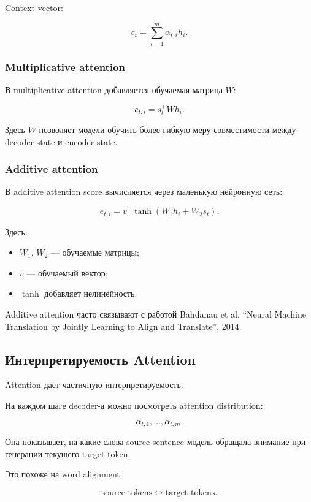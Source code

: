 \documentclass[a4paper,12pt]{article}
\begin{document}
Context vector:

\[
c_t
=
\sum_{i=1}^{m}
\alpha_{t,i}h_i.
\]

\subsubsection{Multiplicative attention}

В multiplicative attention добавляется обучаемая матрица \(W\):

\[
e_{t,i}
=
s_t^\top W h_i.
\]

Здесь \(W\) позволяет модели обучить более гибкую меру совместимости между decoder state и encoder state.

\subsubsection{Additive attention}

В additive attention score вычисляется через маленькую нейронную сеть:

\[
e_{t,i}
=
v^\top
\tanh(W_1 h_i + W_2 s_t).
\]

Здесь:

\begin{itemize}
    \item \(W_1\), \(W_2\) --- обучаемые матрицы;
    \item \(v\) --- обучаемый вектор;
    \item \(\tanh\) добавляет нелинейность.
\end{itemize}

Additive attention часто связывают с работой Bahdanau et al. ``Neural Machine Translation by Jointly Learning to Align and Translate'', 2014.

\subsection{Интерпретируемость Attention}

Attention даёт частичную интерпретируемость.

На каждом шаге decoder-а можно посмотреть attention distribution:

\[
\alpha_{t,1}, \dots, \alpha_{t,m}.
\]

Она показывает, на какие слова source sentence модель обращала внимание при генерации текущего target token.

Это похоже на word alignment:

\[
\text{source tokens}
\leftrightarrow
\text{target tokens}.
\]
\end{document}
